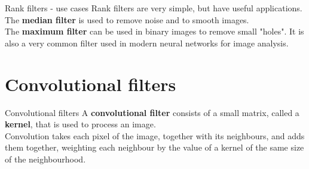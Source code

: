 \documentclass[9pt, aspectratio=169]{beamer}
\begin{document}
\begin{frame}
    {Rank filters - use cases}
    Rank filters are very simple, but have useful applications.\\

    The \textbf{median filter} is used to remove noise and to smooth images.\\
    \pause
    \vspace{1em}
    The \textbf{maximum filter} can be used in binary images to remove  small "holes". It is also a very common filter used in modern neural networks for image analysis.\\
\end{frame}

\section{Convolutional filters}

\begin{frame}
    {Convolutional filters}
    A \textbf{convolutional filter} consists of a small matrix, called a \textbf{kernel}, that is used to process an image.\\

    Convolution takes each pixel of the image, together with its neighbours, and adds them together, weighting each neighbour by the value of a kernel of the same size of the neighbourhood.

\end{frame}
\end{document}
